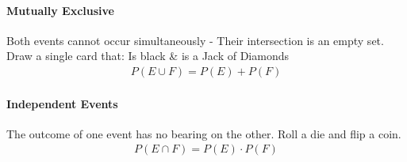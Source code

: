\documentclass[11pt]{article}
\begin{document}
    \paragraph{Mutually Exclusive}
    Both events cannot occur simultaneously - Their intersection is an empty set. \\
    Draw a single card that: Is black \& is a Jack of Diamonds
    \begin{align}
        P\left(E \cup F\right) = P\left(E\right) + P\left(F\right)
    \end{align}

    \paragraph{Independent Events}
    The outcome of one event has no bearing on the other.
    Roll a die and flip a coin.
    \begin{align}
        P\left(E \cap F\right) = P\left(E\right) \cdot P\left(F\right)
    \end{align}
\end{document}
